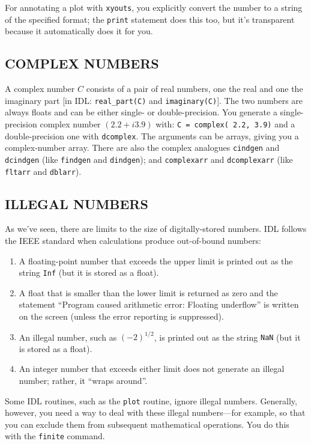 \documentclass[psfig,preprint]{aastex}
\begin{document}
\noindent For annotating a plot with \verb$xyouts$, you explicitly
convert the number to a string of the specified format; the \verb$print$
statement does this too, but it's transparent because it automatically
does it for you.  

\subsection{COMPLEX NUMBERS}

A complex number $C$ consists of a pair of real numbers, one the real and
one the imaginary part [in IDL: {\tt real\_part(C)} and {\tt imaginary(C)}].
The two numbers are always floats and can be either single- or
double-precision. You generate a single-precision complex number $(2.2 +
i3.9)$ with: {\tt C = complex( 2.2, 3.9)} and a double-precision one with
{\tt dcomplex}. The arguments can be arrays, giving you a complex-number
array. There are also the complex analogues {\tt cindgen} and {\tt
  dcindgen} (like {\tt findgen} and {\tt dindgen}); and {\tt complexarr}
and {\tt dcomplexarr} (like {\tt fltarr} and {\tt dblarr}).


\subsection{ILLEGAL  NUMBERS}

As we've seen, there are limits to the size of digitally-stored
numbers. IDL follows the IEEE standard when calculations produce
out-of-bound numbers: \begin{enumerate}

\item A floating-point number that exceeds the upper limit is printed out
  as the string {\tt Inf} (but it is stored as a float).
  \item A float that is smaller than the lower limit is returned as zero
    and the statement ``Program caused arithmetic error: Floating
    underflow'' is written on the screen (unless the error reporting is
    suppressed).
\item An illegal number, such as $(-2)^{1/2}$, is printed out as the string
  {\tt NaN} (but it is stored as a float).
\item An integer number that exceeds either limit does not generate an
  illegal number; rather, it ``wraps around''. 

\end{enumerate}

Some IDL routines, such as the {\tt plot} routine, ignore illegal
numbers. Generally, however, you need a way to deal with these illegal
numbers---for example, so that you can exclude them from subsequent
mathematical operations. You do this with the {\tt finite} command. 
\end{document}
